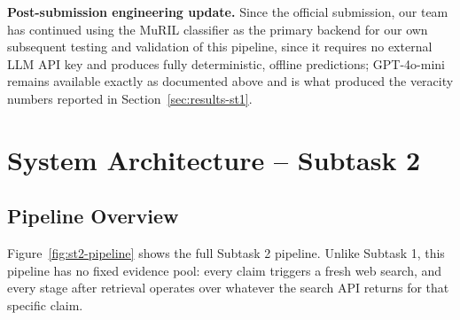 \documentclass[
]{ceurart}
\begin{document}
\textbf{Post-submission engineering update.} Since the official
submission, our team has continued using the MuRIL classifier as the
primary backend for our own subsequent testing and validation of this
pipeline, since it requires no external LLM API key and produces fully
deterministic, offline predictions; GPT-4o-mini remains available
exactly as documented above and is what produced the veracity numbers
reported in Section~\ref{sec:results-st1}.

\section{System Architecture -- Subtask 2}
\label{sec:st2-arch}

\subsection{Pipeline Overview}

Figure~\ref{fig:st2-pipeline} shows the full Subtask 2 pipeline. Unlike
Subtask 1, this pipeline has no fixed evidence pool: every claim
triggers a fresh web search, and every stage after retrieval operates
over whatever the search API returns for that specific claim.
\end{document}
